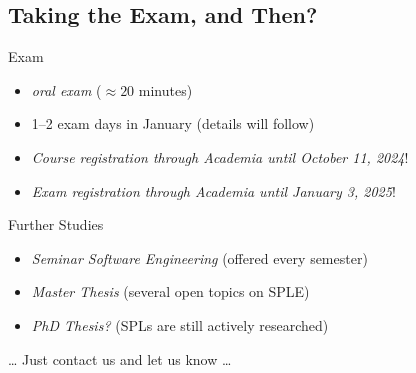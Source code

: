\subsection{Taking the Exam, and Then?}

\begin{frame}{\myframetitle}
	\begin{fancycolumns}
		\begin{definition}{Exam}
			\begin{itemize}
				\item \emph{oral exam} ($\approx 20$ minutes)
				\item 1--2 exam days in January (details will follow)
				\item \emph{Course registration through Academia until October 11, 2024}!
				\item \emph{Exam registration through Academia until January 3, 2025}!
			\end{itemize}
		\end{definition}
	\nextcolumn
		\begin{example}{Further Studies}
			\begin{itemize}
				\item \emph{Seminar Software Engineering} (offered every semester)
				\item \emph{Master Thesis} (several open topics on SPLE)
				\item \emph{PhD Thesis?} (SPLs are still actively researched)
			\end{itemize}
			\ldots{} Just contact us and let us know \ldots
		\end{example}
	\end{fancycolumns}
\end{frame}
